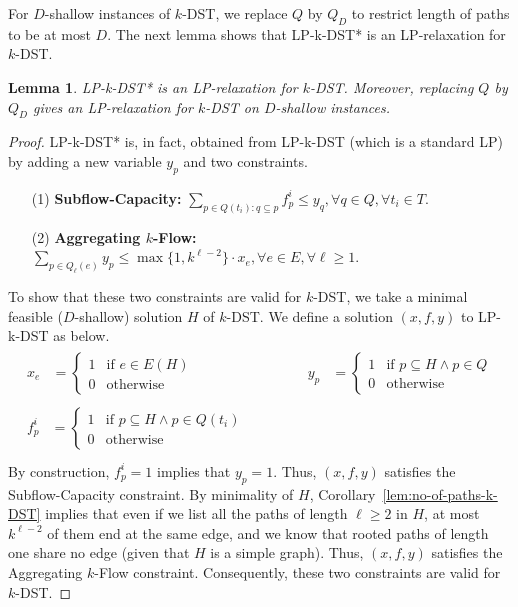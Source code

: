\documentclass[11pt]{article}
\newtheorem{lemma}[theorem]{Lemma}
\theoremstyle{definition}
\theoremstyle{remark}
\begin{document}
For $D$-shallow instances of $k$-DST, we replace $Q$ by $Q_D$
to restrict length of paths to be at most $D$. 
The next lemma shows that LP-k-DST* is an LP-relaxation for $k$-DST.

\begin{lemma} \label{lem:valid-LP-k-DST*}
LP-k-DST* is an LP-relaxation for $k$-DST.
Moreover, replacing $Q$ by $Q_D$ gives an LP-relaxation for $k$-DST on
$D$-shallow instances.
\end{lemma}

\begin{proof}
LP-k-DST* is, in fact, obtained from LP-k-DST (which is a standard LP)
by adding a new variable $y_p$ and two constraints.
\begin{itemize}
\item[(1)] {\bf Subflow-Capacity:}
  $\displaystyle\sum_{p\in Q(t_i):q\subseteq p}f^i_p \leq y_q,
     \forall q\in Q, \forall t_i\in T$.
\item[(2)]{\bf Aggregating $k$-Flow:}
  $\displaystyle\sum_{p\in Q_{\ell}(e)}y_p 
     \leq \max\{1,k^{\ell-2}\}\cdot x_e,  
     \forall e\in E, \forall \ell \geq 1$.
\end{itemize}

To show that these two constraints are valid for $k$-DST,
we take a minimal feasible ($D$-shallow) solution
$H$ of $k$-DST.
We define a solution $(x,f,y)$ to LP-k-DST as below.
\[
\begin{array}{lcl}
  \begin{array}{rl}
    x_e &= \left\{\begin{array}{rl}
              1 & \mbox{if $e\in E(H)$}\\
              0 & \mbox{otherwise}
           \end{array}\right.
  \end{array}
 & \qquad &
  \begin{array}{rl}
    y_p &= \left\{\begin{array}{rl}
              1 & \mbox{if $p\subseteq H \land p\in Q$}\\
              0 & \mbox{otherwise}
           \end{array}\right.
  \end{array}\\
\begin{array}{rl}
    f^i_p &= \left\{\begin{array}{rl}
              1 & \mbox{if $p\subseteq H \land p\in Q(t_i)$}\\
              0 & \mbox{otherwise}
           \end{array}\right.
  \end{array}\\
\end{array}
\]
By construction, $f^i_p = 1$ implies that $y_p=1$.
Thus, $(x,f,y)$ satisfies the Subflow-Capacity constraint.
By minimality of $H$, Corollary~\ref{lem:no-of-paths-k-DST} 
implies that even if we list all the paths of length $\ell\geq 2$ in
$H$, at most $k^{\ell-2}$ of them end at the same edge, and we know
that rooted paths of length one share no edge 
(given that $H$ is a simple graph).
Thus, $(x,f,y)$ satisfies the Aggregating $k$-Flow constraint.
Consequently, these two constraints are valid for $k$-DST.


\end{proof}
\end{document}
